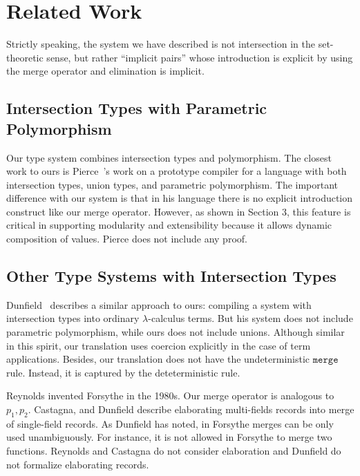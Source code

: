 \section{Related Work}

Strictly speaking, the system we have described is not intersection in the
set-theoretic sense, but rather ``implicit pairs'' whose introduction is
explicit by using the merge operator and elimination is implicit.

\subsection{Intersection Types with Parametric Polymorphism}

Our type system combines intersection types and polymorphism. The closest work
to ours is Pierce~\cite{pierce1991programming}'s work on a prototype compiler for
a language with both intersection types, union types, and parametric
polymorphism. The important difference with our system is that in his language
there is no explicit introduction construct like our merge operator. However, as
shown in Section 3, this feature is critical in supporting modularity and
extensibility because it allows dynamic composition of values. Pierce does not
include any proof.

\subsection{Other Type Systems with Intersection Types}


Dunfield~\cite{dunfield2014elaborating} describes a similar approach to ours:
compiling a system with intersection types into ordinary $\lambda$-calculus
terms. But his system does not include parametric polymorphism, while ours does
not include unions. Although similar in this spirit, our translation uses
coercion explicitly in the case of term applications. Besides, our translation
does not have the undeterministic $ \texttt{merge} $ rule. Instead, it is
captured by the deteterministic  rule.

Reynolds invented Forsythe in the 1980s. Our merge operator is analogous to
$ p_1, p_2 $. Castagna, and Dunfield describe elaborating multi-fields records
into merge of single-field records. As Dunfield has noted, in Forsythe merges
can be only used unambiguously. For instance, it is not allowed in Forsythe to
merge two functions. Reynolds and Castagna do not consider elaboration and
Dunfield do not formalize elaborating records.

